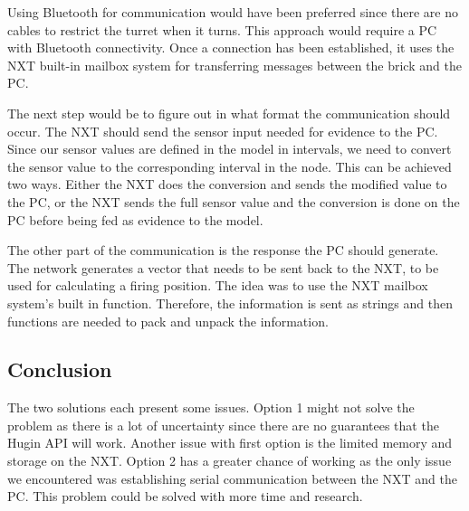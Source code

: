 Using Bluetooth for communication would have been preferred since there are
no cables to restrict the turret when it turns.
This approach would require a PC with Bluetooth connectivity. Once a connection
has been established, it uses the NXT built-in mailbox system for transferring
messages between the brick and the PC.\nl

The next step would be to figure out in what format the communication should
occur.
The NXT should send the sensor input needed for evidence to the PC. Since our
sensor values are defined in the model in intervals, we need to convert the
sensor value to the corresponding interval in the node. This can be achieved two ways. Either the NXT does the conversion and sends the modified value to the PC, or the NXT
sends the full sensor value and the conversion is done on the PC before
being fed as evidence to the model.\nl

The other part of the communication is the response the PC should generate. The
network generates a vector that needs to be sent back to the NXT, to be used for
calculating a firing position. The idea was to use the NXT mailbox system's
built in  function. Therefore, the information is sent as
strings and then functions are needed to pack and unpack the information.

\subsection{Conclusion}
The two solutions each present some issues. Option 1 might not solve the
problem as there is a lot of uncertainty since there are no guarantees that the Hugin
API will work. Another issue with first option is the limited memory and storage
on the NXT. Option 2 has a greater chance of working as the only issue we
encountered was establishing serial communication between the NXT and the PC.
This problem could be solved with more time and research.



